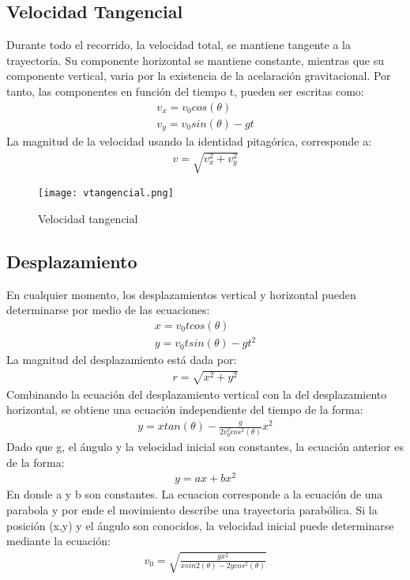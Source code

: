 \documentclass[12pt,a4paper]{article}
\begin{document}
\subsection{Velocidad Tangencial}
Durante todo el recorrido, la velocidad total, se mantiene tangente a la trayectoria. Su componente horizontal se mantiene constante, mientras que su componente vertical, varia por la existencia de la acelaración gravitacional. Por tanto, las componentes en función del tiempo t, pueden ser escritas como:
\begin{eqnarray}
v_{x}=v_{0}cos(\theta) \nonumber\\
v_{y}=v_{0}sin(\theta)-gt 
\end{eqnarray}
La magnitud de la velocidad usando la identidad pitagórica, corresponde a:
\begin{eqnarray}
v=\sqrt{v_{x}^{2}+v_{y}^{2}}
\end{eqnarray}
\begin{figure}[htbp]
\centering
\texttt{[image: vtangencial.png]} 
\caption{Velocidad tangencial}\label{fig:figura3}
\end{figure}
\subsection{Desplazamiento}
En cualquier momento, los desplazamientos vertical y horizontal pueden determinarse por medio de las ecuaciones:
\begin{eqnarray}
x=v_{0}tcos(\theta)\nonumber\\
y=v_{0}tsin(\theta)-gt^{2}
\end{eqnarray}
La magnitud del desplazamiento está dada por:
\begin{eqnarray}
r=\sqrt{x^{2}+y^{2}}
\end{eqnarray}
Combinando la ecuación del desplazamiento vertical con la del desplazamiento horizontal, se obtiene una ecuación independiente del tiempo de la forma:
\begin{eqnarray}
y=xtan(\theta)-\frac{g}{2v_{0}^{2}cos^{2}(\theta)}x^{2}
\end{eqnarray}
Dado que g, el ángulo y la velocidad inicial son constantes, la ecuación anterior es de la forma:
\begin{eqnarray}
y=ax+bx^{2}
\end{eqnarray}
En donde a y b son constantes. La ecuacion corresponde a la ecuación de una parabola y por ende el movimiento describe una trayectoria parabólica. Si la posición (x,y) y el ángulo  son conocidos, la velocidad inicial puede determinarse mediante la ecuación:
\begin{eqnarray}
v_{0}=\sqrt{\frac{gx^{2}}{xsin2(\theta)-2ycos^{2}(\theta)}}
\end{eqnarray}
\end{document}
